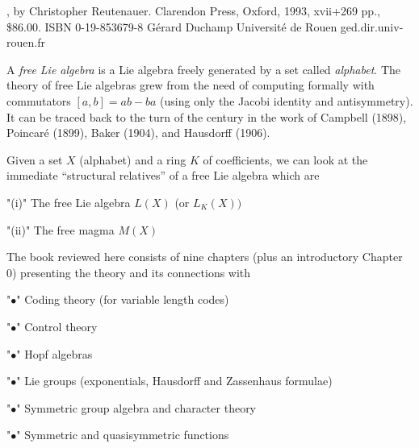 %

\dsqcup{\hbox{\mathsurround=0pt$\sqcup\kern-2pt\sqcup$}}
\NS{\dsqcup} %

\topmatter

, by  Christopher Reutenauer. Clarendon 
Press, Oxford, 1993, xvii+269 pp., \$86.00. ISBN 0-19-853679-8 \endrevtop
\reviewer   G\'erard Duchamp \endreviewer
\affil      Universit\'e de Rouen \endaffil
\ml ged\@lir.dir.univ-rouen.fr \endml 
\endtopmatter

\document               

A {\it free Lie algebra\/} is a Lie algebra freely generated by a set called
{\it alphabet\/}.  The theory of free Lie algebras grew from the need of
computing formally with commutators $[a,b]=ab-ba$ (using only the Jacobi
identity and antisymmetry).  It can be traced back to the turn of the century
in the work of Campbell (1898), Poincar\'e (1899), Baker (1904), and Hausdorff 
(1906).

Given a set $X$ (alphabet) and a ring $K$ of coefficients, we can look at the
immediate ``structural relatives'' of a free Lie algebra which are
\roster
\item "(i)" The free Lie algebra $L(X)$ (or $L_K(X))$
\item "(ii)" The free magma $M(X)$
\endroster

The book reviewed here consists of nine chapters (plus an introductory Chapter
0) presenting the theory and its connections with
\roster
\item "$\bullet$" Coding theory (for variable length codes)
\item "$\bullet$" Control theory 
\item "$\bullet$" Hopf algebras
\item "$\bullet$" Lie groups (exponentials, Hausdorff and Zassenhaus formulae)
\item "$\bullet$" Symmetric group algebra and character theory
\item "$\bullet$" Symmetric and quasisymmetric functions
\endroster

